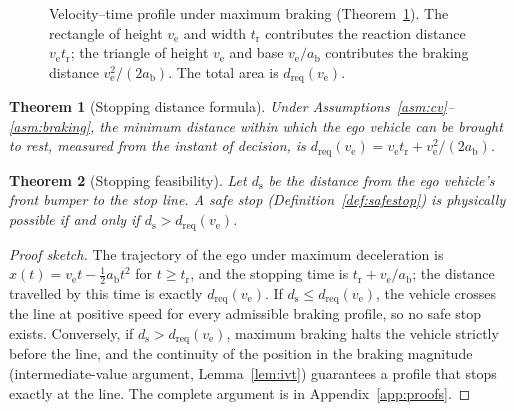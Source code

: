 \documentclass[conference, a4paper]{IEEEtran}
\theoremstyle{plain}
\newtheorem{theorem}{Theorem}
\newcommand{\dreq}{d_{\mathrm{req}}}
\newcommand{\ds}{d_{\mathrm{s}}}
\newcommand{\ab}{a_{\mathrm{b}}}
\newcommand{\tr}{t_{\mathrm{r}}}
\newcommand{\ve}{v_{\mathrm{e}}}
\begin{document}
\begin{figure}[t]
\centering
{}
\caption{Velocity--time profile under maximum braking
(Theorem~\ref{thm:stopdist}). The rectangle of height $\ve$ and width $\tr$
contributes the reaction distance $\ve\tr$; the triangle of height $\ve$ and
base $\ve/\ab$ contributes the braking distance $\ve^2/(2\ab)$. The total
area is $\dreq(\ve)$.}
\label{fig:vt}
\end{figure}

\begin{theorem}[Stopping distance formula]
\label{thm:stopdist}
Under Assumptions~\ref{asm:cv}--\ref{asm:braking}, the minimum distance within
which the ego vehicle can be brought to rest, measured from the instant of
decision, is $\dreq(\ve) = \ve \tr + \ve^2/(2\ab)$.
\end{theorem}

\begin{theorem}[Stopping feasibility]
\label{thm:stopfeas}
Let $\ds$ be the distance from the ego vehicle's front bumper to the stop
line. A safe stop (Definition~\ref{def:safestop}) is physically possible if
and only if $\ds > \dreq(\ve)$.
\end{theorem}

\begin{proof}[Proof sketch]
The trajectory of the ego under maximum deceleration is
$x(t) = \ve t - \tfrac{1}{2}\ab t^2$ for $t \geq \tr$, and the stopping time
is $\tr + \ve/\ab$; the distance travelled by this time is exactly
$\dreq(\ve)$. If $\ds \leq \dreq(\ve)$, the vehicle crosses the line at
positive speed for every admissible braking profile, so no safe stop exists.
Conversely, if $\ds > \dreq(\ve)$, maximum braking halts the vehicle strictly
before the line, and the continuity of the position in the braking magnitude
(intermediate-value argument, Lemma~\ref{lem:ivt}) guarantees a profile that
stops exactly at the line. The complete argument is in
Appendix~\ref{app:proofs}.
\end{proof}
\end{document}
